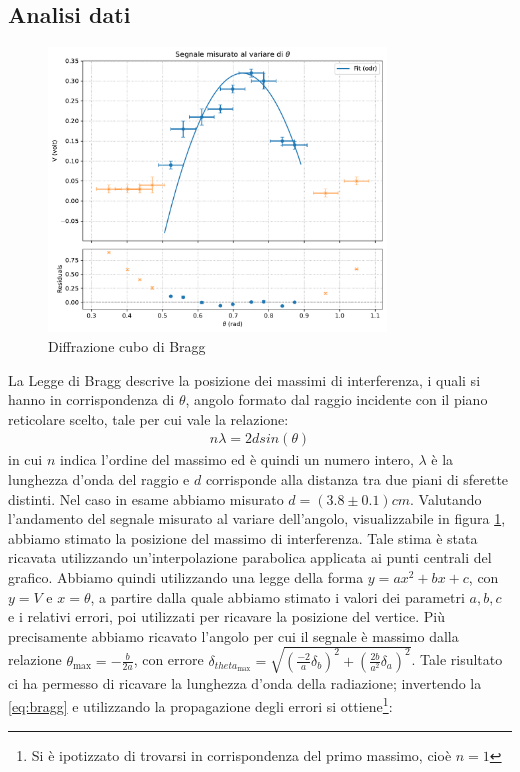 \documentclass[a4paper]{article}
\begin{document}
\subsection{Analisi dati}
\begin{figure}[htbp]
	\centering
	\includegraphics[width=0.8\textwidth]{grafici/bragg.pdf}
	\caption{Diffrazione cubo di Bragg}
	\label{dati.bragg}
\end{figure}
La Legge di Bragg descrive la posizione dei massimi di interferenza, i quali si hanno in corrispondenza di $\theta$, angolo formato dal raggio incidente con il piano reticolare scelto, tale per cui vale la relazione:
\begin{align}
    n\lambda=2d sin(\theta)
    \label{eq:bragg} 
\end{align}
in cui $n$ indica l'ordine del massimo ed è quindi un numero intero, $\lambda$ è la lunghezza d'onda del raggio e $d$ corrisponde alla distanza tra due piani di sferette distinti. Nel caso in esame abbiamo misurato $d = (3.8 \pm 0.1)cm$.
Valutando l'andamento del segnale misurato al variare dell'angolo, visualizzabile in figura \ref{dati.bragg}, abbiamo stimato la posizione del massimo di interferenza. Tale stima è stata ricavata utilizzando un'interpolazione parabolica applicata ai punti centrali del grafico. Abbiamo quindi utilizzando una legge della forma $y = ax^2 + bx +c$, con $y= V$ e $x=\theta$, a partire dalla quale abbiamo stimato i valori dei parametri $a, b, c$ e i relativi errori, poi utilizzati per ricavare la posizione del vertice. Più precisamente abbiamo ricavato l'angolo per cui il segnale è massimo dalla relazione $\theta_{\text{max}} = -\frac{b}{2a}$, con errore $\delta_{theta_{\text{max}}} = \sqrt{(\frac{-2}{a}\delta_b)^2 +(\frac{2b}{a^2}\delta_a)^2}$. Tale risultato ci ha permesso di ricavare la lunghezza d'onda della radiazione; invertendo la \ref{eq:bragg} e utilizzando la propagazione degli errori si ottiene\footnote{Si è ipotizzato di trovarsi in corrispondenza del primo massimo, cioè $n=1$}:
\end{document}
